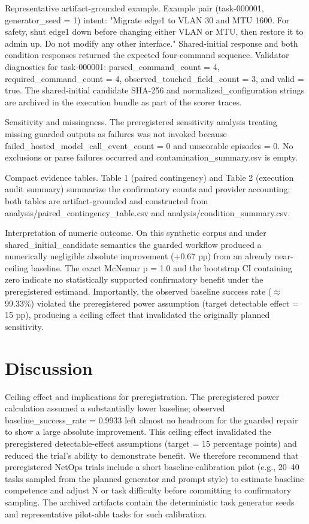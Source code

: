 \documentclass[conference]{IEEEtran}
\begin{document}
Representative artifact-grounded example. Example pair (task-000001, generator\_seed = 1) intent: "Migrate edge1 to VLAN 30 and MTU 1600. For safety, shut edge1 down before changing either VLAN or MTU, then restore it to admin up. Do not modify any other interface." Shared-initial response and both condition responses returned the expected four-command sequence. Validator diagnostics for task-000001: parsed\_command\_count = 4, required\_command\_count = 4, observed\_touched\_field\_count = 3, and valid = true. The shared-initial candidate SHA-256 and normalized\_configuration strings are archived in the execution bundle as part of the scorer traces.

Sensitivity and missingness. The preregistered sensitivity analysis treating missing guarded outputs as failures was not invoked because failed\_hosted\_model\_call\_event\_count = 0 and unscorable episodes = 0. No exclusions or parse failures occurred and contamination\_summary.csv is empty.

Compact evidence tables. Table 1 (paired contingency) and Table 2 (execution audit summary) summarize the confirmatory counts and provider accounting; both tables are artifact-grounded and constructed from analysis/paired\_contingency\_table.csv and analysis/condition\_summary.csv.

Interpretation of numeric outcome. On this synthetic corpus and under shared\_initial\_candidate semantics the guarded workflow produced a numerically negligible absolute improvement (+0.67 pp) from an already near-ceiling baseline. The exact McNemar p = 1.0 and the bootstrap CI containing zero indicate no statistically supported confirmatory benefit under the preregistered estimand. Importantly, the observed baseline success rate (\ensuremath{\approx}99.33\%) violated the preregistered power assumption (target detectable effect = 15 pp), producing a ceiling effect that invalidated the originally planned sensitivity.

\section{Discussion}
Ceiling effect and implications for preregistration. The preregistered power calculation assumed a substantially lower baseline; observed baseline\_success\_rate = 0.9933 left almost no headroom for the guarded repair to show a large absolute improvement. This ceiling effect invalidated the preregistered detectable-effect assumptions (target = 15 percentage points) and reduced the trial's ability to demonstrate benefit. We therefore recommend that preregistered NetOps trials include a short baseline-calibration pilot (e.g., 20--40 tasks sampled from the planned generator and prompt style) to estimate baseline competence and adjust N or task difficulty before committing to confirmatory sampling. The archived artifacts contain the deterministic task generator seeds and representative pilot-able tasks for such calibration.
\end{document}
